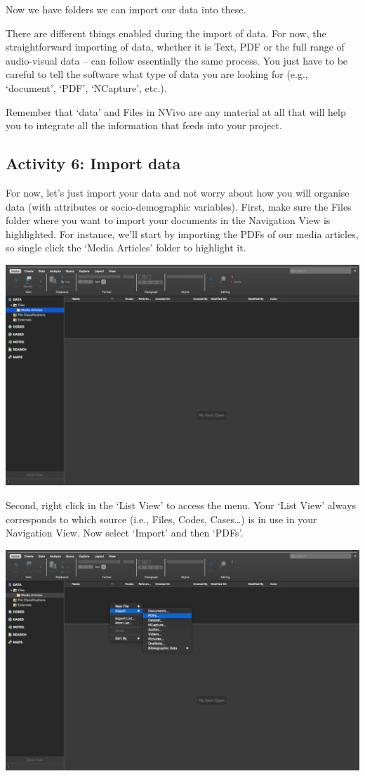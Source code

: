 \documentclass[
]{book}
\begin{document}
Now we have folders we can import our data into these.

There are different things enabled during the import of data. For now, the straightforward importing of data, whether it is Text, PDF or the full range of audio-visual data -- can follow essentially the same process. You just have to be careful to tell the software what type of data you are looking for (e.g., `document', `PDF', `NCapture', etc.).

Remember that `data' and Files in NVivo are any material at all that will help you to integrate all the information that feeds into your project.

\hypertarget{activity-6-import-data}{%
\subsection{Activity 6: Import data}\label{activity-6-import-data}}

For now, let's just import your data and not worry about how you will organise data (with attributes or socio-demographic variables). First, make sure the Files folder where you want to import your documents in the Navigation View is highlighted. For instance, we'll start by importing the PDFs of our media articles, so single click the `Media Articles' folder to highlight it.

\includegraphics{imgs/media_folder.png}

Second, right click in the `List View' to access the menu. Your `List View' always corresponds to which source (i.e., Files, Codes, Cases\ldots) is in use in your Navigation View. Now select `Import' and then `PDFs'.

\includegraphics{imgs/import_pdf.png}
\end{document}

